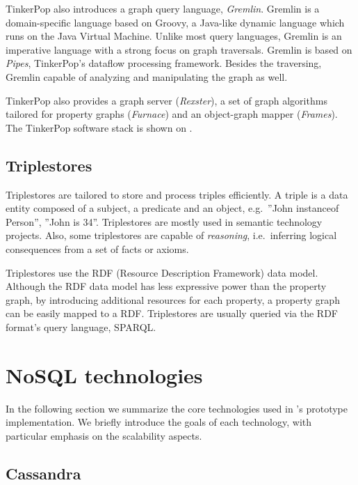 
TinkerPop also introduces a graph query language, \textit{Gremlin}. Gremlin is a domain-specific language based on Groovy, a Java-like dynamic language which runs on the Java Virtual Machine. Unlike most query languages, Gremlin is an imperative language with a strong focus on graph traversals. Gremlin is based on \textit{Pipes}, TinkerPop's dataflow processing framework. Besides the traversing, Gremlin capable of analyzing and manipulating the graph as well.

TinkerPop also provides a graph server (\textit{Rexster}), a set of graph algorithms tailored for property graphs (\textit{Furnace}) and an object-graph mapper (\textit{Frames}). The TinkerPop software stack is shown on .


\subsection{Triplestores}

Triplestores are tailored to store and process triples efficiently. A triple is a data entity composed of a subject, a predicate and an object, e.g.\ ''John instanceof Person'', ''John is 34''. Triplestores are mostly used in semantic technology projects. Also, some triplestores are capable of \emph{reasoning}, i.e.\ inferring logical consequences from a set of facts or axioms. 

Triplestores use the RDF (Resource Description Framework) data model. Although the RDF data model has less expressive power than the property graph, by introducing additional resources for each property, a property graph can be easily mapped to a RDF. Triplestores are usually queried via the RDF format's query language, SPARQL. 

\section{NoSQL technologies}

In the following section we summarize the core technologies used in \iqd's prototype implementation. We briefly introduce the goals of each technology, with particular emphasis on the scalability aspects.

\subsection{Cassandra}

